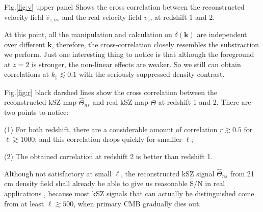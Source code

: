 Fig.\ref{fig:v} upper panel Shows the cross correlation between 
the reconstructed velocity field $\hat v_{z,ns}$ and the real velocity field $v_z$, at redshift 1 and 2. 

At this point, all the manipulation and calculation on $\delta(\bm{k})$ are independent over different $\bm{k}$, 
therefore, the cross-correlation closely resembles the substraction we perform. 
Just one interesting thing to notice is that although the foreground at $z=2$ is stronger, 
the non-linear effects are weaker.  
So we still can obtain correlations at $k_\parallel \lesssim 0.1$ with the seriously suppressed density contrast. 

Fig.\ref{fig:r} black darshed lines show the cross correlation between the reconstructed kSZ map 
$\hat\Theta_{ns}$ and real kSZ map $\Theta$ at redshift 1 and 2.  
There are two points to notice: 

(1) For both redshift, there are a considerable amount of correlation 
$r\gtrsim0.5$ for $\ell \gtrsim 1000$; 
and this correlation drops quickly for smalller $\ell$; 

(2) The obtained correlation at redshift 2 is better than redshift 1.

Although not satisfactory at small $\ell$, the reconstructed kSZ signal $\hat \Theta_{ns}$ 
from 21 cm density field shall already be able to give us reasonable S/N in real applications  
, because most kSZ signals that can actually be distinguished come from at least $\ell \gtrsim 500$, when primary CMB gradually dies out. 



